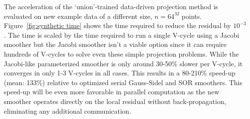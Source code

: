 \documentclass[review]{elsarticle}
\begin{document}
The acceleration of the `union'-trained data-driven projection method is evaluated on new example data of a different size, $n=64^M$ points. Figure~\ref{fig:synthetic time} shows the time required to reduce the residual by $10^{-3}$. The time is scaled by the time required to run a single V-cycle using a Jacobi smoother but the Jacobi smoother isn't a viable option since it can require hundreds of V-cycles to solve even these simple projection problems. While the Jacobi-like parameterized smoother is only around 30-50\% slower per V-cycle, it converges in only 1-3 V-cycles in all cases. This results in a 80-210\% speed-up (mean: 133\%) relative to optimized serial Gauss-Sidel and SOR smoothers. This speed-up will be even more favorable in parallel computation as the new smoother operates directly on the local residual without back-propagation, eliminating any additional communication.
\end{document}
